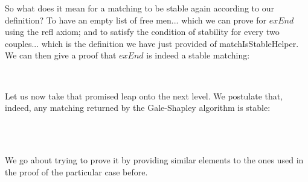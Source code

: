 {So what does it mean for a matching to be stable again according to our definition? To have an empty list of free men... which we can prove for $exEnd$ using the refl axiom; and to satisfy the condition of stability for every two couples... which is the definition we have just provided of matchIsStableHelper. We can then give a proof that $exEnd$ is indeed a stable matching: 

\begin{code}%
\>[0]\AgdaSpace{}%
\AgdaSymbol{:}\AgdaSpace{}%
\AgdaSpace{}%
\<%
\\
\>[0]\AgdaSpace{}%
\AgdaSymbol{=}\AgdaSpace{}%
\AgdaSpace{}%
\AgdaOperator{\AgdaInductiveConstructor{,}}\AgdaSpace{}%
\<%
\end{code}

Let us now take that promised leap onto the next level. We postulate that, indeed, any matching returned by the Gale-Shapley algorithm is stable:

\begin{code}%
\>[0]\<%
\\
\>[0][@{}l@{\AgdaIndent{0}}]%
\>[2]\AgdaSpace{}%
\AgdaSymbol{:}\AgdaSpace{}%
\AgdaSpace{}%
\AgdaSymbol{(}\AgdaSpace{}%
\AgdaSpace{}%
\AgdaSymbol{:}\AgdaSpace{}%
\AgdaSymbol{)}\AgdaSpace{}%
\AgdaSpace{}%
\AgdaSpace{}%
\AgdaSpace{}%
\AgdaSpace{}%
\AgdaSpace{}%
\<%
\\
\>[2][@{}l@{\AgdaIndent{0}}]%
\>[19]\AgdaSpace{}%
\<%
\end{code}

We go about trying to prove it by providing similar elements to the ones used in the proof of the particular case before.

}
